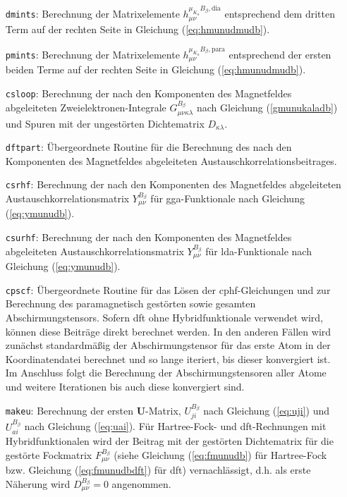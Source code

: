 \begin{itemize}[leftmargin=60pt]
\item[\texttt{dmints}:] Berechnung der Matrixelemente $h_{\mu\nu}^{\mu_{K_\alpha}B_\beta,\textrm{dia}}$ entsprechend dem dritten Term auf der rechten Seite in Gleichung (\ref{eq:hmunudmudb}).
\item[\texttt{pmints}:] Berechnung der Matrixelemente $h_{\mu\nu}^{\mu_{K_\alpha}B_\beta,\textrm{para}}$ entsprechend der ersten beiden Terme auf der rechten Seite in Gleichung (\ref{eq:hmunudmudb}).
\item[\texttt{csloop}:] Berechnung der nach den Komponenten des Magnetfeldes abgeleiteten Zweielektronen-Integrale $G_{\mu\nu\kappa\lambda}^{B_\beta}$ nach Gleichung (\ref{gmunukaladb}) und Spuren mit der ungestörten Dichtematrix $D_{\kappa\lambda}$.
\item[\texttt{dftpart}:] Übergeordnete Routine für die Berechnung des nach den Komponenten des Magnetfeldes abgeleiteten Austauschkorrelationsbeitrages.
\item[\texttt{csrhf}:] Berechnung der nach den Komponenten des Magnetfeldes abgeleiteten Austauschkorrelationsmatrix $Y_{\mu\nu}^{B_\beta}$ für \ac{gga}-Funktionale nach Gleichung (\ref{eq:ymunudb}).
\item[\texttt{csurhf}:] Berechnung der nach den Komponenten des Magnetfeldes abgeleiteten Austauschkorrelationsmatrix $Y_{\mu\nu}^{B_\beta}$ für \ac{lda}-Funktionale nach Gleichung (\ref{eq:ymunudb}).
\item[\texttt{cpscf}:] Übergeordnete Routine für das Lösen der \ac{cphf}-Gleichungen und zur Berechnung des paramagnetisch gestörten sowie gesamten Abschirmungstensors. Sofern \ac{dft} ohne Hybridfunktionale verwendet wird, können diese Beiträge direkt berechnet werden. In den anderen Fällen wird zunächst standardmäßig der Abschirmungstensor für das erste Atom in der Koordinatendatei berechnet und so lange iteriert, bis dieser konvergiert ist. Im Anschluss folgt die Berechnung der Abschirmungstensoren aller Atome und weitere Iterationen bis auch diese konvergiert sind. 
\item[\texttt{makeu}:] Berechnung der ersten $\boldsymbol {U}$-Matrix, $U_{ji}^{B_\beta}$ nach Gleichung (\ref{eq:uji}) und $U_{ai}^{B_\beta}$ nach Gleichung (\ref{eq:uai}). Für Hartree-Fock- und \ac{dft}-Rechnungen mit Hybridfunktionalen wird der Beitrag mit der gestörten Dichtematrix für die gestörte Fockmatrix $F_{\mu\nu}^{B_\beta}$ (siehe Gleichung (\ref{eq:fmunudb}) für Hartree-Fock bzw. Gleichung (\ref{eq:fmunudbdft}) für \ac{dft}) vernachlässigt, d.h. als erste Näherung wird $D_{\mu\nu}^{B_\beta}=0$ angenommen.

\end{itemize}

